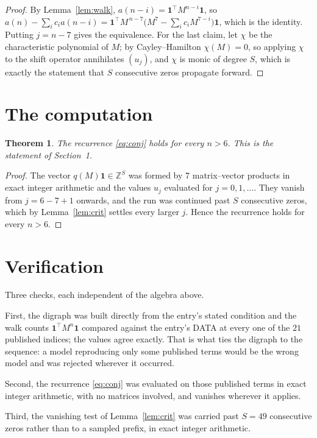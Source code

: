 \documentclass[11pt,a4paper]{article}
\theoremstyle{plain}
\newtheorem{theorem}{Theorem}
\theoremstyle{definition}
\begin{document}
\begin{proof}
By Lemma~\ref{lem:walk}, $a(n-i)=\mathbf{1}^{\!\top}M^{n-i}\mathbf{1}$, so
$a(n)-\sum_i c_i a(n-i)
=\mathbf{1}^{\!\top}M^{\,n-7}\bigl(M^{7}-\sum_i c_i M^{7-i}\bigr)
\mathbf{1}$, which is the identity. Putting $j=n-7$ gives the equivalence. For the
last claim, let $\chi$ be the characteristic polynomial of $M$; by Cayley--Hamilton
$\chi(M)=0$, so applying $\chi$ to the shift operator annihilates $(u_j)$, and $\chi$ is
monic of degree $S$, which is exactly the statement that $S$ consecutive zeros propagate
forward.
\end{proof}

\section{The computation}

\begin{theorem}
The recurrence \eqref{eq:conj} holds for every $n>6$. This is the statement of
Section~1.
\end{theorem}

\begin{proof}
The vector $q(M)\mathbf{1}\in\mathbb{Z}^{S}$ was formed by $7$ matrix--vector
products in exact integer arithmetic and the values $u_j$ evaluated for
$j=0,1,\dots$. They vanish from $j=6-7+1$ onwards, and the run was continued past
$S$ consecutive zeros, which by Lemma~\ref{lem:crit} settles every larger $j$. Hence the
recurrence holds for every $n>6$.
\end{proof}

\section{Verification}

Three checks, each independent of the algebra above.

First, the digraph was built directly from the entry's stated condition and the walk counts
$\mathbf{1}^{\!\top}M^{n}\mathbf{1}$ compared against the entry's DATA at every one of
the $21$ published indices; the values agree exactly. That is what ties the digraph to
the sequence: a model reproducing only some published terms would be the wrong model and
was rejected wherever it occurred.

Second, the recurrence \eqref{eq:conj} was evaluated on those published terms in exact
integer arithmetic, with no matrices involved, and vanishes wherever it applies.

Third, the vanishing test of Lemma~\ref{lem:crit} was carried past $S=49$ consecutive
zeros rather than to a sampled prefix, in exact integer arithmetic.
\end{document}

